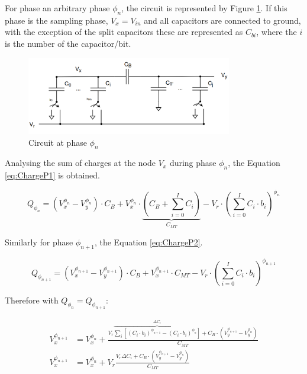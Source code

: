 For phase an arbitrary phase $\phi_n$, the circuit is represented by Figure \ref{fig:P1_Circ}. If this phase is the sampling phase, $V_x = V_{in}$ and all capacitors are connected to ground, with the exception of the split capacitors these are represented as $C_{bi}$, where the $i$ is the number of the capacitor/bit.

\begin{figure}[H]

    \centering
    \includegraphics*[width=0.8\textwidth]{Images/DACCircPn.png}
    \caption{Circuit at phase $\phi_n$}

    \label{fig:P1_Circ}
\end{figure}


Analysing the sum of charges at the node $V_x$ during phase $\phi_n$, the Equation \ref{eq:ChargeP1} is obtained.

\begin{equation}
    Q_{\phi_n} = (V_x^{\phi_n}-V_y^{\phi_n})\cdot C_B + V_x^{\phi_n}\cdot \underbrace{ \left ( C_B + \sum_{i=0}^{I}C_i \right )}_{C_{MT}}-V_r\cdot \left ( \sum_{i=0}^{I} C_i\cdot b_i \right )^{\phi_n}
    \label{eq:ChargeP1}
\end{equation}

Similarly for phase $\phi_{n+1}$, the Equation \ref{eq:ChargeP2}.

\begin{equation}
    Q_{\phi_{n+1}} = (V_x^{\phi_{n+1}}-V_y^{\phi_{n+1}})\cdot C_B + V_x^{\phi_{n+1}}\cdot C_{MT}-V_r\cdot \left ( \sum_{i=0}^{I} C_i\cdot b_i \right )^{\phi_{n+1}}
    \label{eq:ChargeP2}
\end{equation}

Therefore with $Q_{\phi_{n}}=Q_{\phi_{n+1}}$:

\begin{equation}
    \begin{split}
        V_x^{\phi_{n+1}} &= V_x^{\phi_{n}} +  \frac{ V_r\overbrace{\sum_{i}\left[ (C_i\cdot b_i)^{\phi_{n+1}} - (C_i\cdot b_i)^{\phi_{n}}\right]}^{\Delta C_i}+C_B\cdot \left(V_y^{\phi_{n+1}}-V_y^{\phi_{n}}\right)}{C_{MT}} \\
        V_x^{\phi_{n+1}} &= V_x^{\phi_{n}} + V_r \frac{ V_r \Delta C_i +C_B\cdot \left(V_y^{\phi_{n+1}}-V_y^{\phi_{n}}\right)}{C_{MT}}
    \end{split}
    \label{eq:VxPn}
\end{equation}


